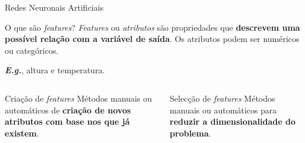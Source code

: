 \begin{frame}{Redes Neuronais Artificiais}

\begin{exampleblock}{O que são \textit{features}?}
    \textit{Features} ou \textit{atributos} são propriedades que \textbf{descrevem uma possível relação com a variável de saída}. Os atributos podem ser numéricos ou categóricos.
    
    \textbf{\textit{E.g.}}, altura e temperatura.
\end{exampleblock}

\pause

\begin{columns}
    \begin{column}{0.45\textwidth}
        \begin{alertblock}{Criação de \textit{features}}
            Métodos manuais ou automáticos de \textbf{criação de novos atributos com base nos que já existem}.
        \end{alertblock}
    \end{column}
    \pause
    \begin{column}{0.45\textwidth}
        \begin{block}{Selecção de \textit{features}}
            Métodos manuais ou automáticos para \textbf{reduzir a dimensionalidade do problema}.
        \end{block}
    \end{column}
\end{columns}


\end{frame}

